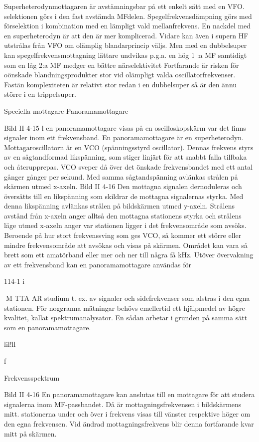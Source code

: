 \documentclass[a4paper,twoside,twocolumn,openright]{book}
\begin{document}
{{{Superheterodynmottagaren är avstämningsbar på ett enkelt sätt med en VFO.
selektionen görs i den fast avstämda MFdelen. Spegelfrekvensdämpning görs med
förselektion i kombination med en lämpligt
vald mellanfrekvens.
En nackdel med en superheterodyn är
att den är mer komplicerad. Vidare kan även
i supern HF utstrålas från VFO om olämplig
blandarprincip väljs.
Men med en dubbelsuper kan spegelfrekvensmottagning lättare undvikas p.g.a.
en hög 1 :a MF samtidigt som en låg 2:a MF
medger en bättre närselektivitet
Fortfarande är risken för oönskade blandningsprodukter stor vid olämpligt valda oscillatorfrekvenser.
Fastän komplexiteten är relativt stor redan i en dubbelsuper så är den ännu större
i en trippelsuper.

Speciella mottagare
Panoramamottagare

Bild II 4-15
l en panoramamottagare visas på en oscilloskopskärm var det finns signaler inom ett
frekvensband. En panoramamottagare är
en superheterodyn. Mottagaroscillatorn är
en VCO (spänningsstyrd oscillator). Dennas frekvens styrs av en sågtandformad
likspänning, som stiger linjärt för att snabbt
falla tillbaka och återupprepas. VCO sveper
då över det önskade frekvensbandet med
ett antal gånger gånger per sekund. Med
samma sågtandspänning avlänkas strålen
på skärmen utmed x-axeln. Bild II 4-16
Den mottagna signalen dernoduleras och
översätts till en likspänning som skildrar de
mottagna signalernas styrka. Med denna
likspänning avlänkas strålen på bildskärmen utmed y-axeln. Strålens avstånd från
x-axeln anger alltså den mottagna stationens styrka och strålens läge utmed x-axeln
anger var stationen ligger i det frekvensområde som avsöks. Beroende på hur stort
frekvenssving som ges VCO, så kommer ett
större eller mindre frekvensområde att
avsökas och visas på skärmen. Området
kan vara så brett som ett amatörband eller
mer och ner till några få kHz.
Utöver övervakning av ett frekvensband
kan en panoramamottagare användas för

114-1 i

M TTA AR
studium t. ex. av signaler och sidefrekvenser
som alstras i den egna stationen. För noggranna mätningar behövs emellertid ett hjälpmedel av högre kvalitet, kallat spektrumanalysator. En sådan arbetar i grunden på
samma sätt som en panoramamottagare.

lil!ll

f

Frekvensspektrum

Bild II 4-16
En panoramamottagare kan anslutas till en
mottagare för att studera signalerna inom
MF-passbandet. Då är mottagningsfrekvensen i bildskärmens mitt. stationerna under
och över i frekvens visas till vänster respektive höger om den egna frekvensen.
Vid ändrad mottagningsfrekvens blir
denna fortfarande kvar mitt på skärmen.

}}}
\end{document}
